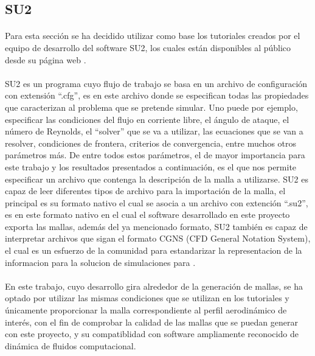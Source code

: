 \documentclass[letterpaper, openright, 12pt]{book}
\begin{document}
    \subsection{SU2}
    \paragraph*{}
    Para esta sección se ha decidido utilizar como base los tutoriales creados
    por el equipo de desarrollo del software SU2, los cuales están disponibles
    al público desde su página web \cite{SU2}.

    \paragraph*{}
    SU2 es un programa cuyo flujo de trabajo se basa en un archivo de
    configuración con extensión ``.cfg'', es en este archivo donde se
    especifican todas las propiedades que caracterizan al problema que se
    pretende simular. Uno puede por ejemplo, especificar las condiciones del
    flujo en corriente libre, el ángulo de ataque, el número de Reynolds, el
    ``solver'' que se va a utilizar, las ecuaciones que se van a resolver,
    condiciones de frontera, criterios de convergencia, entre muchos otros
    parámetros más. De entre todos estos parámetros, el de mayor importancia
    para este trabajo y los resultados presentados a continuación, es el que
    nos permite especificar un archivo que contenga la descripción de la malla
    a utilizarse. SU2 es capaz de leer diferentes tipos de archivo para la
    importación de la malla, el principal es su formato nativo el cual
    se asocia a un archivo con extención ``.su2'', es en este formato nativo en
    el cual el software desarrollado en este proyecto exporta las mallas,
    además del ya mencionado formato, SU2 también es capaz de interpretar
    archivos que sigan el formato CGNS (CFD General Notation System), el cual
    es un esfuerzo de la comunidad para estandarizar la representacion de la
    informacion para la solucion de simulaciones para \@DFC.

    \paragraph*{}
    En este trabajo, cuyo desarrollo gira alrededor de la generación de mallas,
    se ha optado por utilizar las mismas condiciones que se utilizan en los
    tutoriales y únicamente proporcionar la malla correspondiente al perfil
    aerodinámico de interés, con el fin de comprobar la calidad de las mallas
    que se puedan generar con este proyecto, y su compatiblidad con software
    ampliamente reconocido de dinámica de fluidos computacional.
\end{document}
